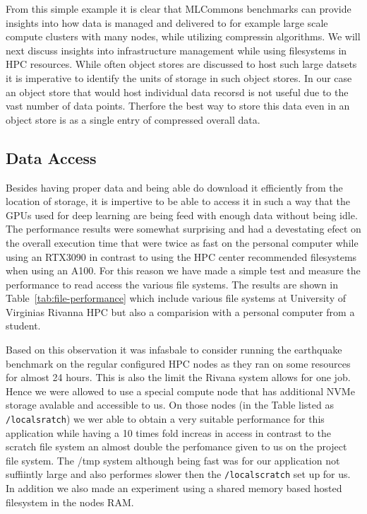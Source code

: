 From this simple example it is clear that MLCommons benchmarks can
provide insights into how data is managed and delivered to for example
large scale compute clusters with many nodes, while utilizing
compressin algorithms. We will next discuss insights into
infrastructure management while using filesystems in HPC resources.
While often object stores are discussed to host such large datsets it
is imperative to identify the units of storage in such object stores.
In our case an object store that would host individual data recorsd is
not useful due to the vast number of data points. Therfore the best
way to store this data even in an object store is as a single entry of
compressed overall data.


\subsection{Data Access}

Besides having proper data and being able do download it efficiently
from the location of storage, it is impertive to be able to access it
in such a way that the GPUs used for deep learning are being feed with
enough data without being idle. The performance results were somewhat
surprising and had a devestating efect on the overall execution time
that were twice as fast on the personal computer while using an
RTX3090 in contrast to using the HPC center recommended filesystems
when using an A100. For this reason we have made a simple test and
measure the performance to read access the various file systems. The
results are shown in Table~\ref{tab:file-performance} which include
various file systems at University of Virginias Rivanna HPC but also a
comparision with a personal computer from a student.

Based on this observation it was infasbale to consider running the
earthquake benchmark on the regular configured HPC nodes as they ran
on some resources for almost 24 hours. This is also the limit the
Rivana system allows for one job. Hence we were allowed to use a
special compute node that has additional NVMe storage avalable and
accessible to us. On those nodes (in the Table listed as
\verb|/localsratch|) we wer able to obtain a very suitable performance
for this application while having a 10 times fold increas in access in
contrast to the scratch file system an almost double the perfomance
given to us on the project file system. The /tmp system although being
fast was for our application not suffiintly large and also performes
slower then the \verb|/localscratch| set up for us. In addition we
also made an experiment using a shared memory based hosted filesystem
in the nodes RAM.


